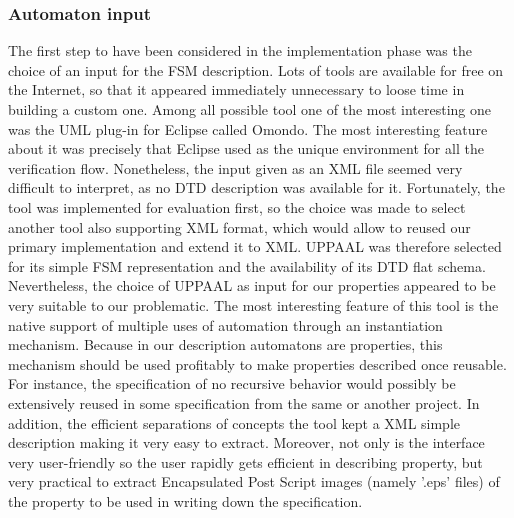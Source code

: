 \subsubsection{Automaton input} 
The first step to have been considered in the implementation phase was the choice of an input for the FSM description. Lots of tools are available for free on the Internet, so that it appeared immediately unnecessary to loose time in building a custom one. Among all possible tool one of the most interesting one was the UML plug-in for Eclipse called Omondo. The most interesting feature about it was precisely that Eclipse used as the unique environment for all the verification flow. Nonetheless, the input given as an XML file seemed very difficult to interpret, as no DTD description was available for it. Fortunately, the tool was implemented for evaluation first, so the choice was made to select another tool also supporting XML format, which would allow to reused our primary implementation and extend it to XML. UPPAAL was therefore selected for its simple FSM representation and the availability of its DTD flat schema. 
Nevertheless, the choice of UPPAAL as input for our properties appeared to be very suitable to our problematic. The most interesting feature of this tool is the native support of multiple uses of automation through an instantiation mechanism. Because in our description automatons are properties, this mechanism should be used profitably to make properties described once reusable. For instance, the specification of no recursive behavior would possibly be extensively reused in some specification from the same or another project. In addition, the efficient separations of concepts the tool kept a XML simple description making it very easy to extract. Moreover, not only is the interface very user-friendly so the user rapidly gets efficient in describing property, but very practical to extract Encapsulated Post Script images (namely '.eps' files) of the property to be used in writing down the specification.

